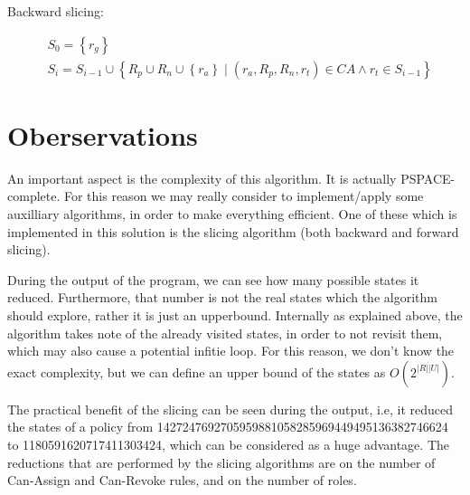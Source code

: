 \documentclass[12pt]{article}
\begin{document}
Backward slicing:

$$
\begin{aligned}
&S_{0}=\left\{r_{g}\right\} \\
&S_{i}=S_{i-1} \cup\left\{R_{p} \cup R_{n} \cup\left\{r_{a}\right\} \mid\left(r_{a}, R_{p}, R_{n}, r_{t}\right) \in C A \wedge r_{t} \in S_{i-1}\right\}
\end{aligned}
$$

\part*{Oberservations}

An important aspect is the complexity of this algorithm. It is actually PSPACE-complete. For this reason we may really consider
to implement/apply some auxilliary algorithms, in order to make everything efficient.
One of these which is implemented in this solution is the slicing algorithm (both backward and forward slicing).

During the output of the program, we can see how many possible states it reduced.
Furthermore, that number is not the real states which the algorithm should explore, rather it is just an upperbound.
Internally as explained above, the algorithm takes note of the already visited states, in order to not revisit them,
which may also cause a potential infitie loop.
For this reason, we don't know the exact complexity, but we can define an upper bound of the states as $O(2^{|R|\dot |U|})$.

The practical benefit of the slicing can be seen during the output, {\it} i.e, it reduced the states of a policy from
1427247692705959881058285969449495136382746624 to 1180591620717411303424, which can be considered as a huge advantage.
The reductions that are performed by the slicing algorithms are on the number of Can-Assign and Can-Revoke rules, and
on the number of roles.
\end{document}
